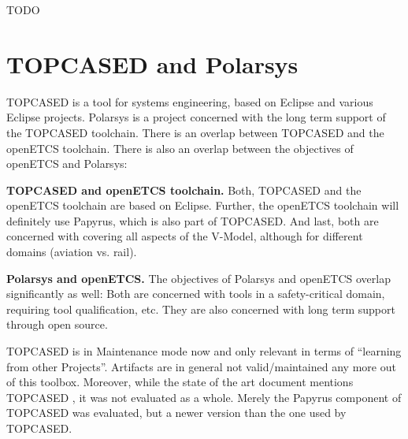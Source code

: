 TODO

\section{TOPCASED and Polarsys}

TOPCASED is a tool for systems engineering, based on Eclipse and various Eclipse projects.  Polarsys is a project concerned with the long term support of the TOPCASED toolchain.  There is an overlap between TOPCASED and the openETCS toolchain.  There is also an overlap between the objectives of openETCS and Polarsys:

\textbf{TOPCASED and openETCS toolchain.} Both, TOPCASED and the openETCS toolchain are based on Eclipse.  Further, the openETCS toolchain will definitely use Papyrus, which is also part of TOPCASED.  And last, both are concerned with covering all aspects of the V-Model, although for different domains (aviation vs. rail).

\textbf{Polarsys and openETCS.}  The objectives of Polarsys and openETCS overlap significantly as well: Both are concerned with tools in a safety-critical domain, requiring tool qualification, etc.  They are also concerned with long term support through open source.


TOPCASED is in Maintenance mode now and only relevant in terms of
``learning from other Projects''. Artifacts are in general not
valid/maintained any more out of this toolbox. 
Moreover, while the state of the art document mentions TOPCASED \citep{D2_1},
 it was not evaluated as a whole.  Merely the Papyrus component of
 TOPCASED was evaluated, but a newer version than the one used by
 TOPCASED.


